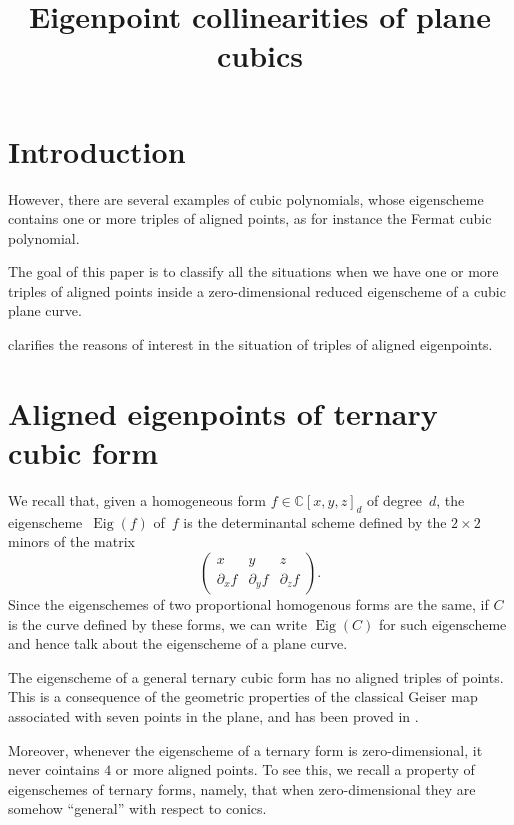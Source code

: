\documentclass[12pt, a4paper, reqno, captions=tableheading,bibliography=totoc]{scrartcl}
\title{Eigenpoint collinearities of plane cubics}
\author{}
\date{}
\theoremstyle{plain}
\theoremstyle{definition}
\newcommand{\C}{\mathbb{C}}
\newcommand{\de}{\partial}
\newcommand{\Eig}[1]{\operatorname{Eig}\left( {#1} \right)}
\begin{document}
\maketitle

\section{Introduction}
\label{introduction}

However, there are several examples of cubic polynomials, whose eigenscheme contains one or more triples of aligned points, as for instance the Fermat cubic polynomial.

The goal of this paper is to classify all the situations when we have one or more triples of aligned points inside a zero-dimensional reduced eigenscheme of a cubic plane curve.

 clarifies the reasons of interest in the situation of triples of aligned eigenpoints.


\section{Aligned eigenpoints of ternary cubic form}
\label{aligned}

We recall that, given a homogeneous form $f \in \C[x,y,z]_d$ of degree~$d$, the eigenscheme~$\Eig{f}$ of~$f$ is the determinantal scheme defined by the $2 \times 2$ minors of the matrix
%
\begin{equation}
\label{eq:def_matrix}
    \begin{pmatrix}
    x & y & z \\
    \de_x f & \de_y f & \de_z f
    \end{pmatrix}.
\end{equation}
%
Since the eigenschemes of two proportional homogenous forms are the same,
if $C$ is the curve defined by these forms,
we can write $\Eig{C}$ for such eigenscheme and hence talk about the eigenscheme of a plane curve.

The eigenscheme of a general ternary cubic form has no aligned triples of points. This is a consequence of the geometric properties of the classical Geiser map associated with seven points in the plane, and has been proved in \cite[Proposition~4.5]{BGV}.

Moreover, whenever the eigenscheme of a ternary form is zero-dimensional, it never cointains $4$ or more aligned points.
To see this, we recall a property of eigenschemes of ternary forms, namely,
that when zero-dimensional they are somehow ``general'' with respect to conics.
\end{document}
